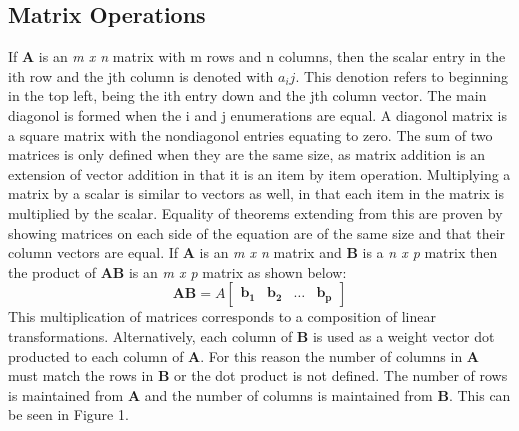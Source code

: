 \documentclass[12pt]{article}
\begin{document}
\subsection{Matrix Operations}
If \textbf{A} is an \textit{m x n} matrix with m rows and n columns, then the scalar entry in the ith row and the jth column is denoted with $a_ij$. %
This denotion refers to beginning in the top left, being the ith entry down and the jth column vector. The main diagonol is formed when the i and j %
enumerations are equal. A diagonol matrix is a square matrix with the nondiagonol entries equating to zero. 
\newline
\newline
The sum of two matrices is only defined when they are the same size, as matrix addition is an extension of vector addition in that it is an item by item operation. %
Multiplying a matrix by a scalar is similar to vectors as well, in that each item in the matrix is multiplied by the scalar. Equality of theorems extending from this %
are proven by showing matrices on each side of the equation are of the same size and that their column vectors are equal. If \textbf{A} is an \textit{m x n} matrix and %
\textbf{B} is a \textit{n x p} matrix then the product of \textbf{AB} is an \textit{m x p} matrix as shown below:
\newline
$$
\mathbf{AB} = A\begin{bmatrix}
    \mathbf{b_1} & \mathbf{b_2} & \mathbf{\dots} & \mathbf{b_p}
\end{bmatrix}
$$
\newline
This multiplication of matrices corresponds to a composition of linear transformations. Alternatively, each column of \textbf{B} is used as a weight vector dot producted%
 to each column of \textbf{A}. For this reason the number of columns in \textbf{A} must match the rows in \textbf{B} or the dot product is not defined. The number of %
rows is maintained from \textbf{A} and the number of columns is maintained from \textbf{B}. This can be seen in Figure 1. 
\newline
\end{document}
